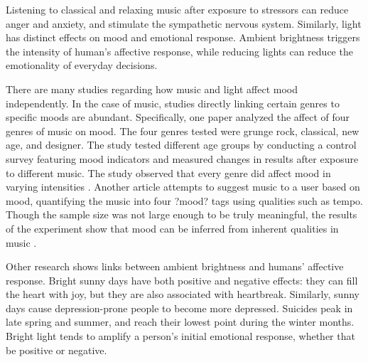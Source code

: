 \documentclass[11pt]{article}
\begin{document}
 Listening to classical and relaxing music after exposure to stressors can reduce anger and anxiety, and stimulate the sympathetic nervous system.\cite{musicstress} Similarly, light has distinct effects on mood and emotional response. Ambient brightness triggers the intensity of human's affective response, while reducing lights can reduce the emotionality of everyday decisions.\cite{light} 

There are many studies regarding how music and light affect mood independently. In the case of music, studies directly linking certain genres to specific moods are abundant. Specifically, one paper analyzed the affect of four genres of music on mood. The four genres tested were grunge rock, classical, new age, and designer. The study tested different age groups by conducting a control survey featuring mood indicators and measured changes in results after exposure to different music. The study observed that every genre did affect mood in varying intensities \cite {mccraty}. Another article attempts to suggest music to a user based on mood, quantifying the music into four ?mood? tags using qualities such as tempo. Though the sample size was not large enough to be truly meaningful, the results of the experiment show that mood can be inferred from inherent qualities in music \cite {feng}. 

Other research shows links between ambient brightness and humans' affective response. Bright sunny days have both positive and negative effects: they can fill the heart with joy, but they are also associated with heartbreak. \cite{kevan} Similarly, sunny days cause depression-prone people to become more depressed. Suicides peak in late spring and summer, and reach their lowest point during the winter months. Bright light tends to amplify a person's initial emotional response, whether that be positive or negative.\cite{xu} 


\newpage 
{}


\end{document}
